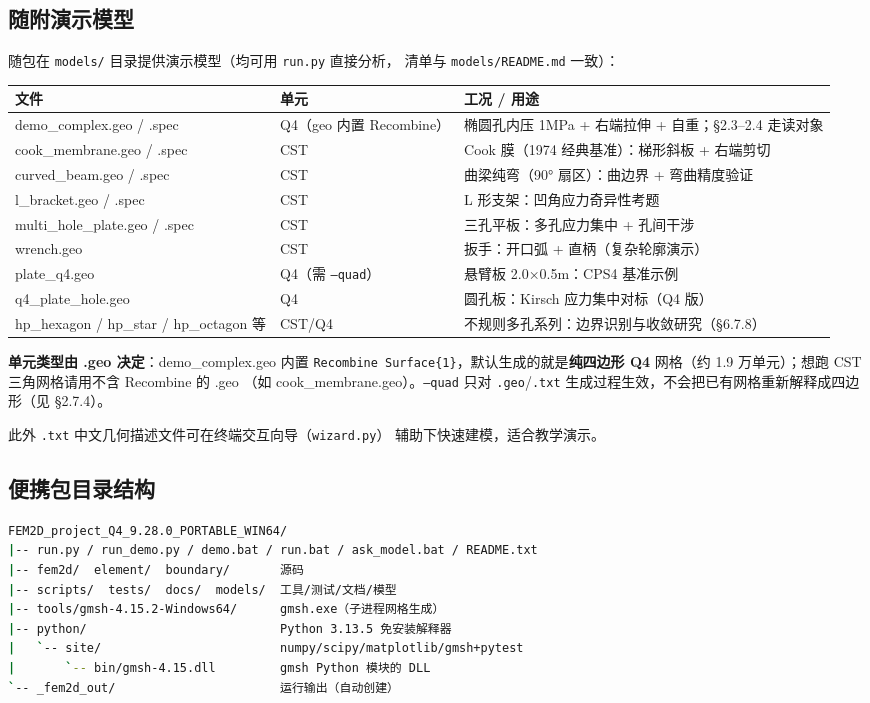 \documentclass[12pt,a4paper]{ctexart}
\newcommand{\fem}{\Verb}
\begin{document}
\subsection{随附演示模型}

随包在 \fem|models/| 目录提供演示模型（均可用 \fem|run.py| 直接分析，
清单与 \fem|models/README.md| 一致）：

\begin{longtable}{p{4.4cm}p{2.8cm}p{7.3cm}}
\toprule
\textbf{文件} & \textbf{单元} & \textbf{工况 / 用途} \\
\midrule
demo\_complex.geo / .spec & Q4（geo 内置 Recombine） & 椭圆孔内压 1MPa + 右端拉伸 + 自重；§2.3--2.4 走读对象 \\
cook\_membrane.geo / .spec & CST & Cook 膜（1974 经典基准）：梯形斜板 + 右端剪切 \\
curved\_beam.geo / .spec & CST & 曲梁纯弯（90° 扇区）：曲边界 + 弯曲精度验证 \\
l\_bracket.geo / .spec & CST & L 形支架：凹角应力奇异性考题 \\
multi\_hole\_plate.geo / .spec & CST & 三孔平板：多孔应力集中 + 孔间干涉 \\
wrench.geo & CST & 扳手：开口弧 + 直柄（复杂轮廓演示） \\
plate\_q4.geo & Q4（需 \texttt{--quad}） & 悬臂板 2.0×0.5m：CPS4 基准示例 \\
q4\_plate\_hole.geo & Q4 & 圆孔板：Kirsch 应力集中对标（Q4 版） \\
hp\_hexagon / hp\_star / hp\_octagon 等 & CST/Q4 & 不规则多孔系列：边界识别与收敛研究（§6.7.8） \\
\bottomrule
\end{longtable}

\textbf{单元类型由 .geo 决定}：demo\_complex.geo 内置
\texttt{Recombine Surface\{1\}}，默认生成的就是\textbf{纯四边形 Q4}
网格（约 1.9 万单元）；想跑 CST 三角网格请用不含 Recombine 的 .geo
（如 cook\_membrane.geo）。\texttt{--quad} 只对 \fem|.geo|/\fem|.txt|
生成过程生效，不会把已有网格重新解释成四边形（见 §2.7.4）。

此外 \fem|.txt| 中文几何描述文件可在终端交互向导（\fem|wizard.py|）
辅助下快速建模，适合教学演示。

\subsection{便携包目录结构}

\begin{lstlisting}[language=bash]
FEM2D_project_Q4_9.28.0_PORTABLE_WIN64/
|-- run.py / run_demo.py / demo.bat / run.bat / ask_model.bat / README.txt
|-- fem2d/  element/  boundary/       源码
|-- scripts/  tests/  docs/  models/  工具/测试/文档/模型
|-- tools/gmsh-4.15.2-Windows64/      gmsh.exe（子进程网格生成）
|-- python/                           Python 3.13.5 免安装解释器
|   `-- site/                         numpy/scipy/matplotlib/gmsh+pytest
|       `-- bin/gmsh-4.15.dll         gmsh Python 模块的 DLL
`-- _fem2d_out/                       运行输出（自动创建）
\end{lstlisting}
\end{document}
